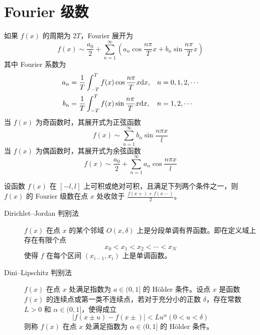 \documentclass{ctexbook}
\def\diff{\textnormal{d}}
\begin{document}
\section{Fourier 级数}

\begin{definition}
    如果 $f(x)$ 的周期为 $2T$，Fourier 展开为
    \begin{equation}
        f(x)\sim\frac{a_0}{2}+\sum_{n=1}^\infty\left(a_n\cos\frac{n\pi}{T}x+b_n\sin\frac{n\pi}{T}x\right)
    \end{equation}
    其中 Fourier 系数为
    \begin{align}
        a_n&=\frac{1}{T}\int_{-T}^T f(x)\cos\frac{n\pi}{T}x\diff x, &&n=0,1,2,\cdots\\
        b_n&=\frac{1}{T}\int_{-T}^T f(x)\sin\frac{n\pi}{T}x\diff x, &&n=1,2,\cdots
    \end{align}
    当 $f(x)$ 为奇函数时，其展开式为正弦函数
    \begin{equation}
        f(x)\sim\sum_{n=1}^\infty b_n\sin\frac{n\pi x}{l}
    \end{equation}
    当 $f(x)$ 为偶函数时，其展开式为余弦函数
    \begin{equation}
        f(x)\sim\frac{a_0}{2}+\sum_{n=1}^\infty a_n\cos\frac{n\pi x}{l}
    \end{equation}
\end{definition}

\begin{theorem}
    设函数 $f(x)$ 在 $[-l,l]$ 上可积或绝对可积，且满足下列两个条件之一，则 $f(x)$ 的 Fourier 级数在点 $x$ 处收敛于 $\frac{f(x+)+f(x-)}{2}$。
    \begin{description}
        \item[Dirichlet--Jordan 判别法] $f(x)$ 在点 $x$ 的某个邻域 $O(x,\delta)$ 上是分段单调有界函数。即在定义域上存在有限个点
        \begin{equation}
            x_0<x_1<x_2<\cdots<x_N
        \end{equation}
        使得 $f$ 在每个区间 $(x_{i-1},x_i)$ 上是单调函数。
        \item[Dini--Lipschitz 判别法] $f(x)$ 在点 $x$ 处满足指数为 $a\in(0,1]$ 的 H\"older 条件。设点 $x$ 是函数 $f(x)$ 的连续点或第一类不连续点，若对于充分小的正数 $\delta$，存在常数 $L>0$ 和 $\alpha\in(0,1]$，使得成立
        \begin{equation}
            |f(x\pm u)-f(x\pm)|<Lu^\alpha (0<u<\delta)
        \end{equation}
        则称 $f(x)$ 在点 $x$ 处满足指数为 $\alpha\in(0,1]$ 的 H\"older 条件。
    \end{description}
\end{theorem}
\end{document}
